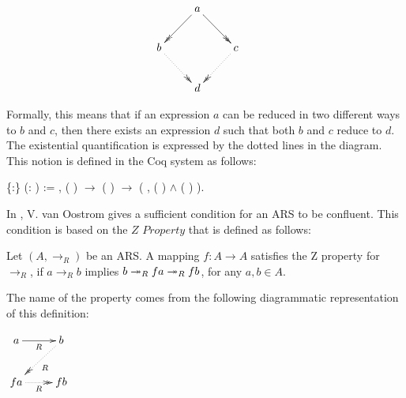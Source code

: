     $\centerline{\xymatrix{ & a \ar@{->>}[dl] \ar@{->>}[dr] & \\ b
    \ar@{.>>}[dr] & & c \ar@{.>>}[dl] \\ & d & }}$


Formally, this means that if an expression $a$ can be reduced in two
different ways to $b$ and $c$, then there exists an expression $d$
such that both $b$ and $c$ reduce to $d$. The existential
quantification is expressed by the dotted lines in the diagram. This
notion is defined in the Coq system as follows: 
\begin{coqdoccode}
\coqdocemptyline
\coqdocnoindent
{}  \{:\} (:  ) := \coqdockw{\ensuremath{\forall}}   , ( )   \ensuremath{\rightarrow} ( )   \ensuremath{\rightarrow} (\coqdoctac{\ensuremath{\exists}} , ( )   \ensuremath{\land} ( )  ).\coqdoceol
\coqdocemptyline
\end{coqdoccode}
In \cite{dehornoy2008z}, V. van Oostrom gives a sufficient condition
for an ARS to be confluent. This condition is based on the $\textit{Z
  Property}$ that is defined as follows:


\begin{definition} Let $(A,\to_R)$ be an ARS. A mapping $f:A \to A$ satisfies the Z property for $\to_R$, if $a \to_R b$ implies
$b \twoheadrightarrow_R f a  \twoheadrightarrow_R f b$, for any $a, b \in A$. 
\end{definition}


The name of the property comes from the following diagrammatic
representation of this definition:


$\xymatrix{ a \ar[r]_R & b \ar@{.>>}[dl]^R\\ f a \ar@{.>>}[r]_R & f
    b \\ }$


